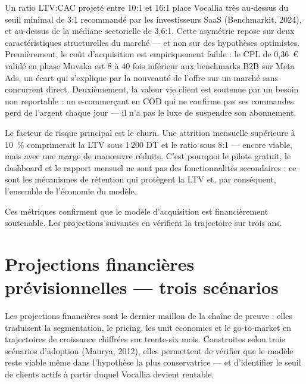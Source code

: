 \begin{tcolorbox}[colback=gray!8, colframe=gray!50, title=\textbf{Interprétation des unit economics}, fonttitle=\bfseries]
Un ratio LTV:CAC projeté entre 10:1 et 16:1 place Vocallia très au-dessus du seuil minimal de 3:1 recommandé par les investisseurs SaaS (Benchmarkit, 2024), et au-dessus de la médiane sectorielle de 3,6:1. Cette asymétrie repose sur deux caractéristiques structurelles du marché --- et non sur des hypothèses optimistes. Premièrement, le coût d'acquisition est empiriquement faible : le CPL de 0,36~\euro{} validé en phase Muvaka est 8 à 40 fois inférieur aux benchmarks B2B sur Meta Ads, un écart qui s'explique par la nouveauté de l'offre sur un marché sans concurrent direct. Deuxièmement, la valeur vie client est soutenue par un besoin non reportable : un e-commerçant en COD qui ne confirme pas ses commandes perd de l'argent chaque jour --- il n'a pas le luxe de suspendre son abonnement.

\medskip
Le facteur de risque principal est le churn. Une attrition mensuelle supérieure à 10~\% comprimerait la LTV sous 1\,200 DT et le ratio sous 8:1 --- encore viable, mais avec une marge de manœuvre réduite. C'est pourquoi le pilote gratuit, le dashboard et le rapport mensuel ne sont pas des fonctionnalités secondaires : ce sont les mécanismes de rétention qui protègent la LTV et, par conséquent, l'ensemble de l'économie du modèle.

\medskip
\noindent Ces métriques confirment que le modèle d'acquisition est financièrement soutenable. Les projections suivantes en vérifient la trajectoire sur trois ans.
\end{tcolorbox}

\section{Projections financières prévisionnelles --- trois scénarios}
\label{section3.10}

Les projections financières sont le dernier maillon de la chaîne de preuve : elles traduisent la segmentation, le pricing, les unit economics et le go-to-market en trajectoires de croissance chiffrées sur trente-six mois. Construites selon trois scénarios d'adoption (Maurya, 2012), elles permettent de vérifier que le modèle reste viable même dans l'hypothèse la plus conservatrice --- et d'identifier le seuil de clients actifs à partir duquel Vocallia devient rentable.


